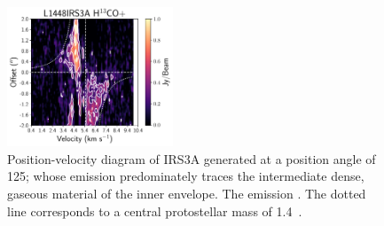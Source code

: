 \begin{figure}[H]
\begin{center}
   \includegraphics[width=0.44\textwidth]{img/PV-Diagram_L1448IRS3B_H13COp_image_taper1500k-wide.pdf} %
\end{center}
   \caption{Position-velocity diagram of IRS3A \htcop\space  generated at a position angle of 125\deg; whose emission predominately traces the intermediate dense, gaseous material of the inner envelope. The emission . The dotted line corresponds to a central protostellar mass of 1.4~\solm.}\label{fig:l1448irs3a_h13cop_pv}
\end{figure}




